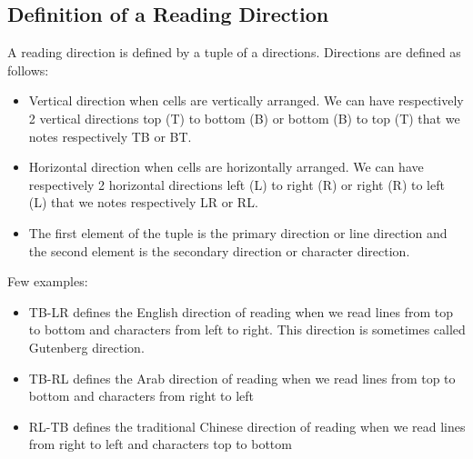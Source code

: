 \documentclass{article}
\begin{document}
\subsection{Definition of a Reading Direction}
A reading direction is defined by a tuple of a directions. Directions are defined as follows:
\begin{itemize}
    \item Vertical direction when cells are vertically arranged. We can have respectively 2 vertical directions top (T)
    to bottom (B) or bottom (B) to top (T) that we notes respectively TB or BT.
    \item Horizontal direction when cells are horizontally arranged. We can have respectively 2 horizontal directions
    left (L) to right (R) or right (R) to left (L) that we notes respectively LR or RL.
    \item The first element of the tuple is the primary direction or line direction and the second element is the
    secondary direction or character direction.
\end{itemize}
Few examples:
\begin{itemize}
    \item TB-LR defines the English direction of reading when we read lines from top to bottom and characters from left
    to right. This direction is sometimes called Gutenberg direction.
    \item TB-RL defines the Arab direction of reading when we read lines from top to bottom and characters from right to
    left
    \item RL-TB defines the traditional Chinese direction of reading when we read lines from right to left and
    characters top to bottom
\end{itemize}
\end{document}
